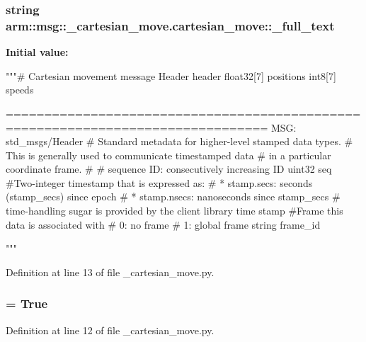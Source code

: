 \subsubsection[{\-\_\-full\-\_\-text}]{\setlength{\rightskip}{0pt plus 5cm}string {\bf arm\-::msg\-::\-\_\-cartesian\-\_\-move.\-cartesian\-\_\-move\-::\-\_\-full\-\_\-text}\hspace{0.3cm}{\ttfamily  [static, private]}}\label{classarm_1_1msg_1_1__cartesian__move_1_1cartesian__move_aae1a6121abeb05ac3b77b9e4429ad007}
{\bfseries \-Initial value\-:}
\begin{DoxyCode}
"""# Cartesian movement message
Header header
float32[7] positions
int8[7] speeds

      ================================================================================
MSG: std_msgs/Header
# Standard metadata for higher-level stamped data types.
# This is generally used to communicate timestamped data 
# in a particular coordinate frame.
# 
# sequence ID: consecutively increasing ID 
uint32 seq
#Two-integer timestamp that is expressed as:
# * stamp.secs: seconds (stamp_secs) since epoch
# * stamp.nsecs: nanoseconds since stamp_secs
# time-handling sugar is provided by the client library
time stamp
#Frame this data is associated with
# 0: no frame
# 1: global frame
string frame_id

"""
\end{DoxyCode}


\-Definition at line 13 of file \-\_\-cartesian\-\_\-move.\-py.

\subsubsection[{\-\_\-has\-\_\-header}]{ = \-True\hspace{0.3cm}{\ttfamily  [static, private]}}\label{classarm_1_1msg_1_1__cartesian__move_1_1cartesian__move_a1142fbac5c7a3b3cf79d2c5f59b78d72}


\-Definition at line 12 of file \-\_\-cartesian\-\_\-move.\-py.

